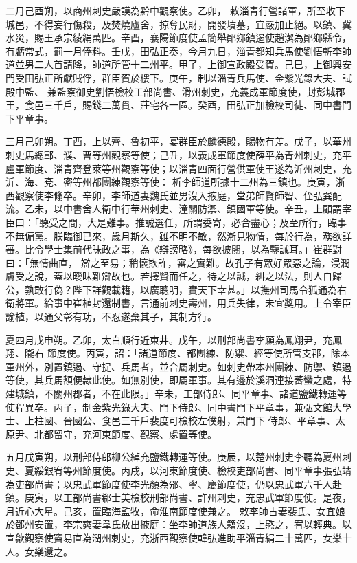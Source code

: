 \begin{pinyinscope}
 二月己酉朔，以商州刺史嚴謨為黔中觀察使。乙卯，
 敕淄青行營諸軍，所至收下城邑，不得妄行傷殺，及焚燒廬舍，掠奪民財，開發墳墓，宜嚴加止絕。以鎮、冀水災，賜王承宗綾絹萬匹。辛酉，襄陽節度使孟簡舉鄖鄉鎮遏使趙潔為鄖鄉縣令，有虧常式，罰一月俸料。壬戌，田弘正奏，今月九日，淄青都知兵馬使劉悟斬李師道並男二人首請降，師道所管十二州平。甲了，上御宣政殿受賀。己巳，上御興安門受田弘正所獻賊俘，群臣賀於樓下。庚午，制以淄青兵馬使、金紫光錄大夫、試殿中監、
 兼監察御史劉悟檢校工部尚書、滑州刺史，充義成軍節度使，封彭城郡王，食邑三千戶，賜錢二萬貫、莊宅各一區。癸酉，田弘正加檢校司徒、同中書門下平章事。



 三月己卯朔。丁酉，上以齊、魯初平，宴群臣於麟德殿，賜物有差。戊子，以華州刺史馬總鄆、濮、曹等州觀察等使；己丑，以義成軍節度使薛平為青州刺史，充平盧軍節度、淄青齊登萊等州觀察等使；以淄青四面行營供軍使王遂為沂州刺史，充沂、海、兗、密等州都團練觀察等使：
 析李師道所據十二州為三鎮也。庚寅，浙西觀察使李翛卒。辛卯，李師道妻魏氏並男沒入掖庭，堂弟師賢師智、侄弘巽配流。乙未，以中書舍人衛中行華州刺史、潼關防禦、鎮國軍等使。辛丑，上顧謂宰臣曰：「聽受之間，大是難事。推誠選任，所謂委寄，必合盡心；及至所行，臨事不無偏黨。朕臨御已來，歲月斯久，雖不明不敏，然漸見物情，每於行為，務欲詳審。比令學士集前代昧政之事，為《辯謗略》，每欲披閱，以為鑒誡耳。」崔群對曰：「無情曲直，
 辯之至易；稍懷欺詐，審之實難。故孔子有眾好眾惡之論，浸潤膚受之說，蓋以曖昧難辯故也。若擇賢而任之，待之以誠，糾之以法，則人自歸公，孰敢行偽？陛下詳觀載籍，以廣聰明，實天下幸甚。」以撫州司馬令狐通為右衛將軍。給事中崔植封還制書，言通前刺史壽州，用兵失律，未宜獎用。上令宰臣諭植，以通父彰有功，不忍遂棄其子，其制方行。



 夏四月戊申朔。乙卯，太白順行近東井。戊午，以刑部尚書李願為鳳翔尹，充鳳翔、隴右
 節度使。丙寅，詔：「諸道節度、都團練、防禦、經等使所管支郡，除本軍州外，別置鎮遏、守捉、兵馬者，並合屬刺史。如刺史帶本州團練、防禦、鎮遏等使，其兵馬額便隸此使。如無別使，即屬軍事。其有邊於溪洞連接蕃蠻之處，特建城鎮，不關州郡者，不在此限。」辛未，工部侍郎、同平章事、諸道鹽鐵轉運等使程異卒。丙子，制金紫光錄大夫、門下侍郎、同中書門下平章事，兼弘文館大學士、上柱國、晉國公、食邑三千戶裴度可檢校左僕射，兼門下
 侍郎、平章事、太原尹、北都留守，充河東節度、觀察、處置等使。



 五月戊寅朔，以刑部侍郎柳公綽充鹽鐵轉運等使。庚辰，以楚州刺史李聽為夏州刺史、夏綏銀宥等州節度使。丙戌，以河東節度使、檢校吏部尚書、同平章事張弘靖為吏部尚書；以忠武軍節度使李光顏為邠、寧、慶節度使，仍以忠武軍六千人赴鎮。庚寅，以工部尚書郗士美檢校刑部尚書、許州刺史，充忠武軍節度使。是夜，月近心大星。己亥，置臨海監牧，命淮南節度使兼之。
 敕李師古妻裴氏、女宜娘於鄧州安置，李宗奭妻韋氏放出掖庭：坐李師道族人籍沒，上愍之，宥以輕典。以宣歙觀察使竇易直為潤州刺史，充浙西觀察使韓弘進助平淄青絹二十萬匹，女樂十人。女樂還之。




\end{pinyinscope}
